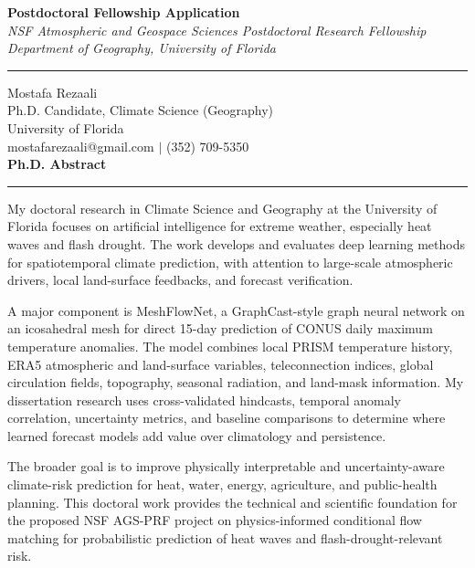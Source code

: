 \documentclass[11pt,letterpaper]{article}
\begin{document}
\begin{center}
    \vspace*{-1.5cm}
    {\Large\bfseries Postdoctoral Fellowship Application} \\[0.2cm]
    {\small\textit{NSF Atmospheric and Geospace Sciences Postdoctoral Research Fellowship}} \\[0.05cm]
    {\small\textit{Department of Geography, University of Florida}} \\[0.1cm]
    \rule{0.6\textwidth}{0.4pt}
\end{center}
\vspace{-0.5cm}

\noindent
Mostafa Rezaali \\
Ph.D. Candidate, Climate Science (Geography) \\
University of Florida \\
mostafarezaali@gmail.com \quad $\mid$ \quad (352) 709-5350 \\[0.3cm]
{\large\bfseries Ph.D. Abstract}\\[-0.15cm]
\rule{\textwidth}{0.4pt}

My doctoral research in Climate Science and Geography at the University of Florida focuses on artificial intelligence for extreme weather, especially heat waves and flash drought. The work develops and evaluates deep learning methods for spatiotemporal climate prediction, with attention to large-scale atmospheric drivers, local land-surface feedbacks, and forecast verification.

A major component is MeshFlowNet, a GraphCast-style graph neural network on an icosahedral mesh for direct 15-day prediction of CONUS daily maximum temperature anomalies. The model combines local PRISM temperature history, ERA5 atmospheric and land-surface variables, teleconnection indices, global circulation fields, topography, seasonal radiation, and land-mask information. My dissertation research uses cross-validated hindcasts, temporal anomaly correlation, uncertainty metrics, and baseline comparisons to determine where learned forecast models add value over climatology and persistence.

The broader goal is to improve physically interpretable and uncertainty-aware climate-risk prediction for heat, water, energy, agriculture, and public-health planning. This doctoral work provides the technical and scientific foundation for the proposed NSF AGS-PRF project on physics-informed conditional flow matching for probabilistic prediction of heat waves and flash-drought-relevant risk.
\end{document}
